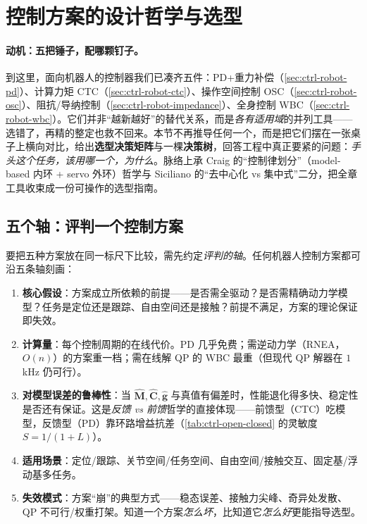 \section{控制方案的设计哲学与选型}
\label{sec:ctrl-scheme-selection}

\paragraph{动机：五把锤子，配哪颗钉子。}
到这里，面向机器人的控制器我们已凑齐五件：PD+重力补偿（\cref{sec:ctrl-robot-pd}）、计算力矩 CTC（\cref{sec:ctrl-robot-ctc}）、操作空间控制 OSC（\cref{sec:ctrl-robot-osc}）、阻抗/导纳控制（\cref{sec:ctrl-robot-impedance}）、全身控制 WBC（\cref{sec:ctrl-robot-wbc}）。它们并非“越新越好”的替代关系，而是\emph{各有适用域}的并列工具——选错了，再精的整定也救不回来。本节不再推导任何一个，而是把它们摆在一张桌子上横向对比，给出\textbf{选型决策矩阵}与一棵\textbf{决策树}，回答工程中真正要紧的问题：\emph{手头这个任务，该用哪一个，为什么}。脉络上承 Craig 的“控制律划分”（model-based 内环 + servo 外环）哲学\cite{spong2006robot}与 Siciliano 的“去中心化 vs 集中式”二分\cite{spong2006robot}，把全章工具收束成一份可操作的选型指南。

\subsection{五个轴：评判一个控制方案}
\label{sec:css-axes}
要把五种方案放在同一标尺下比较，需先约定\emph{评判的轴}。任何机器人控制方案都可沿五条轴刻画：

\begin{enumerate}
  \item \textbf{核心假设}：方案成立所依赖的前提——是否需全驱动？是否需精确动力学模型？任务是定位还是跟踪、自由空间还是接触？前提不满足，方案的理论保证即失效。
  \item \textbf{计算量}：每个控制周期的在线代价。PD 几乎免费；需逆动力学（RNEA，$O(n)$）的方案重一档；需在线解 QP 的 WBC 最重（但现代 QP 解器在 $1$\,kHz 仍可行）。
  \item \textbf{对模型误差的鲁棒性}：当 $\hat{\mathbf{M}},\hat{\mathbf{C}},\hat{\mathbf{g}}$ 与真值有偏差时，性能退化得多快、稳定性是否还有保证。这是\emph{反馈 vs 前馈}哲学的直接体现——前馈型（CTC）吃模型，反馈型（PD）靠环路增益抗差（\cref{tab:ctrl-open-closed} 的灵敏度 $S=1/(1+L)$）。
  \item \textbf{适用场景}：定位/跟踪、关节空间/任务空间、自由空间/接触交互、固定基/浮动基多任务。
  \item \textbf{失效模式}：方案“崩”的典型方式——稳态误差、接触力尖峰、奇异处发散、QP 不可行/权重打架。知道一个方案\emph{怎么坏}，比知道它\emph{怎么好}更能指导选型。
\end{enumerate}


